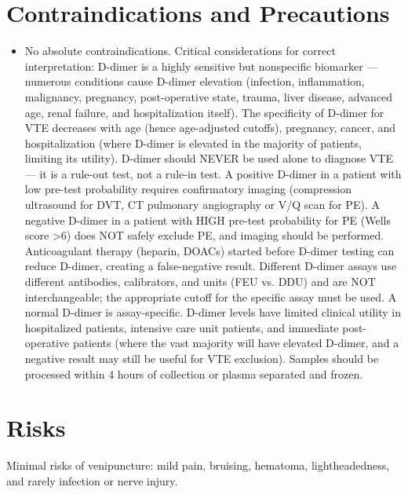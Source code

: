 \section*{Contraindications and Precautions}
\begin{itemize}
  \item No absolute contraindications. Critical considerations for correct interpretation: D-dimer is a highly sensitive but nonspecific biomarker --- numerous conditions cause D-dimer elevation (infection, inflammation, malignancy, pregnancy, post-operative state, trauma, liver disease, advanced age, renal failure, and hospitalization itself). The specificity of D-dimer for VTE decreases with age (hence age-adjusted cutoffs), pregnancy, cancer, and hospitalization (where D-dimer is elevated in the majority of patients, limiting its utility). D-dimer should NEVER be used alone to diagnose VTE --- it is a rule-out test, not a rule-in test. A positive D-dimer in a patient with low pre-test probability requires confirmatory imaging (compression ultrasound for DVT, CT pulmonary angiography or V/Q scan for PE). A negative D-dimer in a patient with HIGH pre-test probability for PE (Wells score >6) does NOT safely exclude PE, and imaging should be performed. Anticoagulant therapy (heparin, DOACs) started before D-dimer testing can reduce D-dimer, creating a false-negative result. Different D-dimer assays use different antibodies, calibrators, and units (FEU vs. DDU) and are NOT interchangeable; the appropriate cutoff for the specific assay must be used. A normal D-dimer is assay-specific. D-dimer levels have limited clinical utility in hospitalized patients, intensive care unit patients, and immediate post-operative patients (where the vast majority will have elevated D-dimer, and a negative result may still be useful for VTE exclusion). Samples should be processed within 4 hours of collection or plasma separated and frozen.
\end{itemize}
\section*{Risks}
Minimal risks of venipuncture: mild pain, bruising, hematoma, lightheadedness, and rarely infection or nerve injury.

